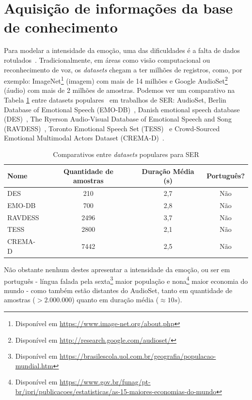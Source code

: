 \section{Aquisição de informações da base de conhecimento}\label{section:basesdedados}

Para modelar a intensidade da emoção, uma das dificuldades é a falta de dados rotulados~\cite{18}. Tradicionalmente, em áreas como visão computacional ou reconhecimento de voz, os \textit{datasets} chegam a ter milhões de registros, como, por exemplo: ImageNet\footnote{Disponível em \url{https://www.image-net.org/about.php}} (imagem) com  mais de 14 milhões e Google AudioSet\footnote{Disponível em \url{http://research.google.com/audioset/}} (áudio) com mais de 2 milhões de amostras. Podemos ver um comparativo na Tabela \ref{table:comparativodbs} entre datasets populares~\cite{32} em trabalhos de \acrshort{SER}: AudioSet, Berlin Database of Emotional Speech (EMO-DB)~\cite{32.55}, Danish emotional speech database (DES)~\cite{32.56}, The Ryerson Audio-Visual Database of Emotional Speech and Song (RAVDESS)~\cite{32.57}, Toronto Emotional Speech Set (TESS)~\cite{32.58} e Crowd-Sourced Emotional Multimodal Actors Dataset (CREMA-D)~\cite{32.59}.

\begin{table}[]
\centering
\caption{Comparativos entre \textit{datasets} populares para \acrshort{SER}}
    \begin{tabular}{|l|c|c|c|}
    \hline
        Nome & Quantidade de amostras & Duração Média (s) & Português?  \\ \hline
        DES  & 210 & 2,7 & Não  \\ \hline
        EMO-DB  & 700 & 2,8 & Não  \\ \hline
        RAVDESS  & 2496 & 3,7 & Não  \\ \hline
        TESS  & 2800 & 2,1 & Não  \\ \hline
        CREMA-D  & 7442 & 2,5 & Não  \\ \hline
    \end{tabular}\label{table:comparativodbs}
\end{table}

Não obstante nenhum destes apresentar a intensidade da emoção, ou ser em português - língua falada pela sexta\footnote{Disponível em \url{https://brasilescola.uol.com.br/geografia/populacao-mundial.htm}} maior população e nona\footnote{Disponível em \url{https://www.gov.br/funag/pt-br/ipri/publicacoes/estatisticas/as-15-maiores-economias-do-mundo}} maior economia do mundo - como também estão distantes do AudioSet, tanto em quantidade de amostras ($> 2.000.000$) quanto em duração média ($\approx 10s$).


